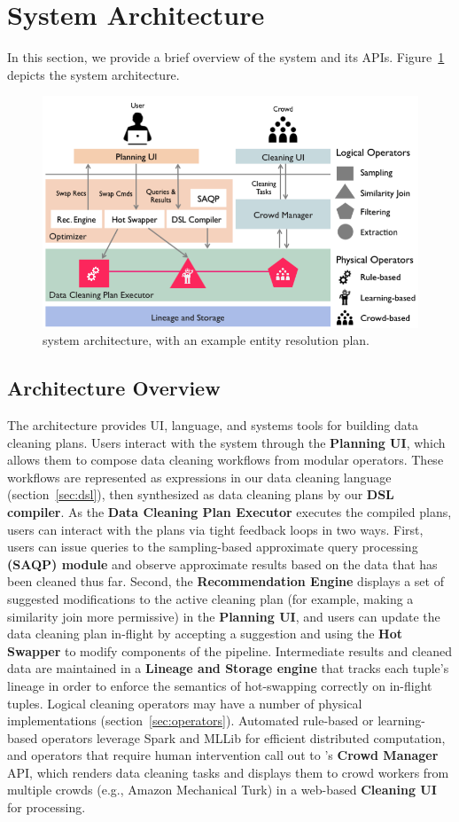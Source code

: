\section{System Architecture}

In this section, we provide a brief overview of the \sys system and its APIs.
Figure~\ref{fig:arch} depicts the system architecture.

\begin{figure}[t]
\centering
\vspace{-0.5cm}
\includegraphics[width = .5\textwidth]{figs/architecture.png}
\vspace{-0.6cm}
\caption{\sys system architecture, with an example entity resolution plan.}
\vspace{-0.6cm}
\label{fig:arch}
\end{figure}

\subsection{Architecture Overview}
The \sys architecture provides UI, language, and systems tools for building data cleaning plans.
Users interact with the system through the \textbf{Planning UI}, which allows them to compose data cleaning workflows from modular operators.
These workflows are represented as expressions in our data cleaning language (section~\ref{sec:dsl}), then synthesized as data cleaning plans by our \textbf{DSL compiler}.
As the \textbf{Data Cleaning Plan Executor} executes the compiled plans, users can interact with the plans via tight feedback loops in two ways.
First, users can issue queries to the sampling-based approximate query processing \textbf{(SAQP) module} and observe approximate results based on the data that has been cleaned thus far.
Second, the \textbf{Recommendation Engine} displays a set of suggested modifications to the active cleaning plan (for example, making a similarity join more permissive) in the \textbf{Planning UI}, and users can update the data cleaning plan in-flight by accepting a suggestion and using the \textbf{Hot Swapper} to modify components of the pipeline.
Intermediate results and cleaned data are maintained in a \textbf{Lineage and Storage engine} that tracks each tuple's lineage in order to enforce the semantics of hot-swapping correctly on in-flight tuples.
Logical cleaning operators may have a number of physical implementations (section~\ref{sec:operators}).
Automated rule-based or learning-based operators leverage Spark and MLLib for efficient distributed computation, and operators that require human intervention call out to \sys's \textbf{Crowd Manager} API, which renders data cleaning tasks and displays them to crowd workers from multiple crowds (e.g., Amazon Mechanical Turk) in a web-based \textbf{Cleaning UI} for processing.

